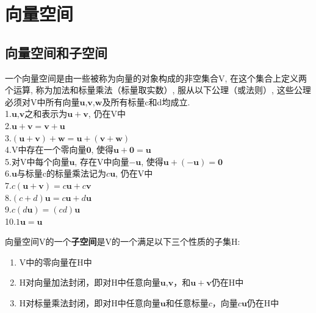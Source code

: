 \chapter{向量空间}
\section{向量空间和子空间}
\begin{definition}
一个向量空间是由一些被称为向量的对象构成的非空集合V, 在这个集合上定义两个运算, 称为加法和标量乘法（标量取实数）, 服从以下公理（或法则）, 这些公理必须对V中所有向量$\mathbf{u}$,$\mathbf{v}$,$\mathbf{w}$及所有标量c和d均成立.\\
1.\quad$\mathbf{u}$,$\mathbf{v}$之和表示为$\mathbf{u}+\mathbf{v}$, 仍在V中\\
2.\quad$\mathbf{u+v=v+u}$\\
3.\quad$\mathbf{(u+v)+w=u+(v+w)}$\\
4.\quad V中存在一个零向量$\mathbf{0}$, 使得$\mathbf{u+0=u}$\\
5.\quad 对V中每个向量$\mathbf{u}$, 存在V中向量$-\mathbf{u}$, 使得$\mathbf{u+(-u)=0}$\\
6.\quad$\mathbf{u}$与标量c的标量乘法记为$c\mathbf{u}$, 仍在V中\\
7.\quad$c\mathbf{(u+v)}=c\mathbf{u}+c\mathbf{v}$\\
8.\quad$(c+d)\mathbf{u}=c\mathbf{u}+d\mathbf{u}$\\
9.\quad$c(d\mathbf{u})=(cd)\mathbf{u}$\\
10.\quad$1\mathbf{u=u}$\\
\end{definition}\vspace{4ex}

{\par\raggedright
{}
\par}\vspace{4ex}

\begin{definition}
向量空间V的一个\textbf{子空间}是V的一个满足以下三个性质的子集H:
\begin{enumerate}
\item V中的零向量在H中
\item H对向量加法封闭，即对H中任意向量$\mathbf{u}$,$\mathbf{v}$，和$\mathbf{u+v}$仍在H中
\item H对标量乘法封闭，即对H中任意向量$\mathbf{u}$和任意标量$c$，向量$c\mathbf{u}$仍在H中
\end{enumerate}
\end{definition}\vspace{4ex}

